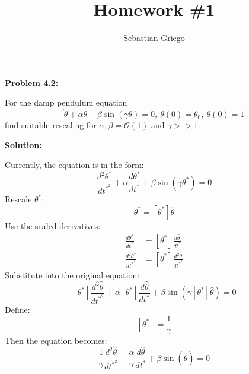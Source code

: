 \documentclass[12pt]{article}
\newenvironment{problem}[1]{
\textbf{Problem #1:}
}{
\rmfamily \vspace{1em}
}
\newenvironment{solution}{
\textbf{Solution:}

}{

\vspace{2em}
}
\begin{document}
\title{Homework \#1}  %
\author{Sebastian Griego}  %

\begin{problem}{4.2}
    For the damp pendulum equation
    \[
        \ddot{\theta} + \alpha \dot{\theta} + \beta \sin(\gamma \theta) = 0, \: \theta(0) = \theta_0, \: \dot{\theta}(0) = 1
    \]
    find suitable rescaling for \(\alpha, \beta = \mathcal{O}(1)\) and \(\gamma > > 1\).
\end{problem}

\begin{solution}
    Currently, the equation is in the form:
    \[
        \frac{d^2\theta^*}{dt^{*^2}} + \alpha \frac{d\theta^*}{dt^*} + \beta \sin(\gamma \theta^*) = 0
    \]
    Rescale \(\theta^*\):
    \[
        \theta^* = [\theta^*] \hat{\theta}
    \]
    Use the scaled derivatives:
    \[
        \begin{aligned}
            \frac{d\theta^*}{dt^*} &= [\theta^*] \frac{d\hat{\theta}}{dt^*} \\
            \frac{d^2\theta^*}{dt^{*^2}} &= [\theta^*] \frac{d^2\hat{\theta}}{dt^{*^2}}
        \end{aligned}
    \]
    Substitute into the original equation:
    \[
        [\theta^*] \frac{d^2\hat{\theta}}{dt^{*^2}} + \alpha [\theta^*] \frac{d\hat{\theta}}{dt^*} + \beta \sin(\gamma [\theta^*] \hat{\theta}) = 0
    \]
    Define:
    \[
        [\theta^*] = \frac{1}{\gamma}
    \]
    Then the equation becomes:
    \[
        \frac{1}{\gamma}\frac{d^2\hat{\theta}}{dt^{*^2}} + \frac{\alpha}{\gamma}\frac{d\hat{\theta}}{dt^*} + \beta \sin(\hat{\theta}) = 0
    \]
    
    



\end{solution}
\end{document}
